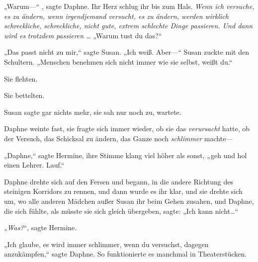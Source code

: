 „Warum—“ , sagte Daphne. Ihr Herz schlug ihr bis zum Hals. \emph{Wenn ich versuche, es zu ändern, wenn irgendjemand versucht, es zu ändern, werden wirklich schreckliche, schreckliche, nicht gute, extrem schlechte Dinge passieren. Und dann wird es} \emph{trotzdem} \emph{passieren …} „Warum tust du das?“

„Das passt nicht zu mir,“ sagte Susan. „Ich weiß. Aber—“ Susan zuckte mit den Schultern. „Menschen benehmen sich nicht immer wie sie selbst, weißt du.“

Sie flehten.

Sie bettelten.

Susan sagte gar nichts mehr, sie sah nur noch zu, wartete.

Daphne weinte fast, sie fragte sich immer wieder, ob sie das \emph{verursacht} hatte, ob der Versuch, das Schicksal zu ändern, das Ganze noch \emph{schlimmer} machte—

„Daphne,“ sagte Hermine, ihre Stimme klang viel höher als sonst, „geh und hol einen Lehrer. Lauf.“

Daphne drehte sich auf den Fersen und begann, in die andere Richtung des steinigen Korridors zu rennen, und dann wurde es ihr klar, und sie drehte sich um, wo alle anderen Mädchen außer Susan ihr beim Gehen zusahen, und Daphne, die sich fühlte, als müsste sie sich gleich übergeben, sagte: „Ich kann nicht…“

„\emph{Was?}“, sagte Hermine.

„Ich glaube, es wird immer schlimmer, wenn du versuchst, dagegen anzukämpfen,“ sagte Daphne. So funktionierte es manchmal in Theaterstücken.

